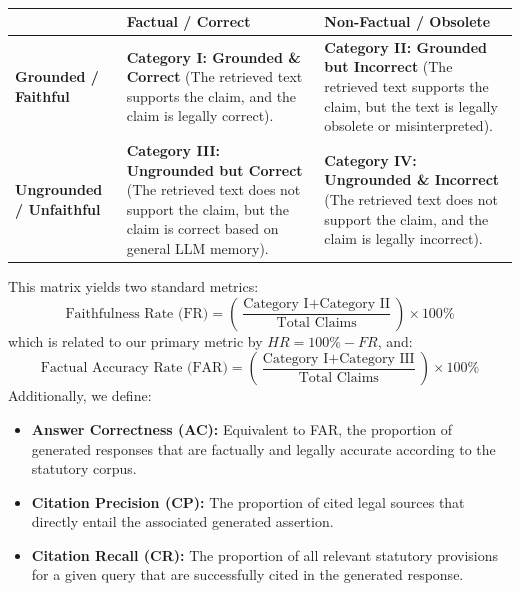 \begin{table}[H]
\caption{
\label{tab:matrix}}
\centering
\small
\begin{tabular}{|l|p{5cm}|p{5cm}|}
\hline
& \textbf{Factual / Correct} & \textbf{Non-Factual / Obsolete} \\ \hline
\textbf{Grounded / Faithful} & \textbf{Category I: Grounded \& Correct} \newline (The retrieved text supports the claim, and the claim is legally correct). & \textbf{Category II: Grounded but Incorrect} \newline (The retrieved text supports the claim, but the text is legally obsolete or misinterpreted). \\ \hline
\textbf{Ungrounded / Unfaithful} & \textbf{Category III: Ungrounded but Correct} \newline (The retrieved text does not support the claim, but the claim is correct based on general LLM memory). & \textbf{Category IV: Ungrounded \& Incorrect} \newline (The retrieved text does not support the claim, and the claim is legally incorrect). \\ \hline
\end{tabular}
\end{table}

This matrix yields two standard metrics:
\begin{equation}
  \text{Faithfulness Rate (FR)} = \left( \frac{\text{Category I} + \text{Category II}}{\text{Total Claims}} \right) \times 100\%
  \label{eq:fr}
\end{equation}
which is related to our primary metric by $HR = 100\% - FR$, and:
\begin{equation}
  \text{Factual Accuracy Rate (FAR)} = \left( \frac{\text{Category I} + \text{Category III}}{\text{Total Claims}} \right) \times 100\%
  \label{eq:far}
\end{equation}
Additionally, we define:
\begin{itemize}
  \item \textbf{Answer Correctness (AC):} Equivalent to FAR, the proportion of generated responses that are factually and legally accurate according to the statutory corpus.
  \item \textbf{Citation Precision (CP):} The proportion of cited legal sources that directly entail the associated generated assertion.
  \item \textbf{Citation Recall (CR):} The proportion of all relevant statutory provisions for a given query that are successfully cited in the generated response.
\end{itemize}


